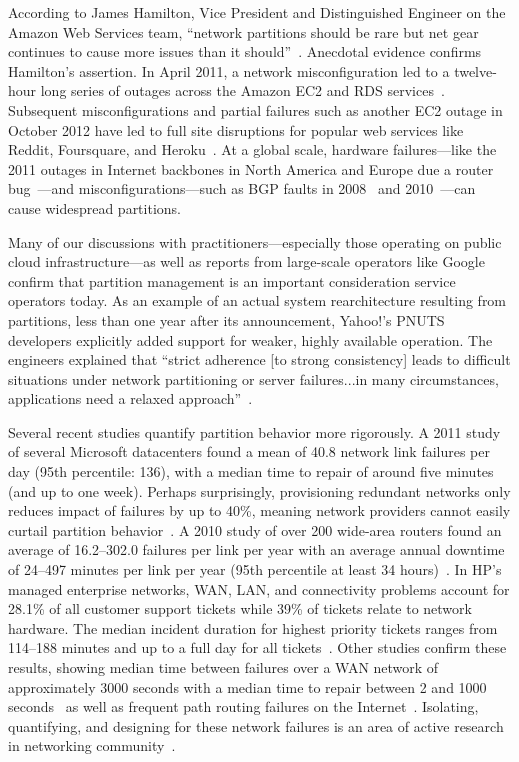 According to James Hamilton, Vice President and Distinguished Engineer
on the Amazon Web Services team, ``network partitions should be rare
but net gear continues to cause more issues than it
should''~\cite{hamilton-partitions}. Anecdotal evidence confirms
Hamilton's assertion. In April 2011, a network misconfiguration led to
a twelve-hour long series of outages across the Amazon EC2 and RDS
services~\cite{amazon-netpartition}. Subsequent misconfigurations and
partial failures such as another EC2 outage in October 2012 have led
to full site disruptions for popular web services like Reddit,
Foursquare, and Heroku~\cite{ec2-downsites}. At a global scale,
hardware failures---like the 2011 outages in Internet backbones in
North America and Europe due a router
bug~\cite{juniper-partition}---and misconfigurations---such as BGP
faults in 2008~\cite{pakistan-youtube} and
2010~\cite{research-experiment-partition}---can cause widespread
partitions.

Many of our discussions with practitioners---especially those
operating on public cloud infrastructure---as well as reports from
large-scale operators like Google~\cite{dean-keynote} confirm that
partition management is an important consideration service operators
today. As an example of an actual system rearchitecture resulting from
partitions, less than one year after its announcement, Yahoo!'s PNUTS
developers explicitly added support for weaker, highly available
operation. The engineers explained that ``strict adherence [to strong
  consistency] leads to difficult situations under network
partitioning or server failures...in many circumstances, applications
need a relaxed approach''~\cite{pnuts-update}.

Several recent studies quantify partition behavior more rigorously. A
2011 study of several Microsoft datacenters found a mean of 40.8
network link failures per day (95th percentile: 136), with a median
time to repair of around five minutes (and up to one week). Perhaps
surprisingly, provisioning redundant networks only reduces impact of
failures by up to 40\%, meaning network providers cannot easily
curtail partition behavior~\cite{sigcomm-dc}. A 2010 study of over 200
wide-area routers found an average of 16.2--302.0 failures per link
per year with an average annual downtime of 24--497 minutes per link
per year (95th percentile at least 34 hours)~\cite{sigcomm-wan}. In
HP's managed enterprise networks, WAN, LAN, and connectivity problems
account for 28.1\% of all customer support tickets while 39\% of
tickets relate to network hardware.  The median incident duration for
highest priority tickets ranges from 114--188 minutes and up to a full
day for all tickets~\cite{turner2012failure}. Other studies confirm
these results, showing median time between failures over a WAN network
of approximately 3000 seconds with a median time to repair between 2
and 1000 seconds~\cite{ip-backbone-failures} as well as frequent path
routing failures on the Internet~\cite{labovitz-failures}. Isolating,
quantifying, and designing for these network failures is an area of
active research in networking
community~\cite{surviving-failures-bodik, uw-failure-networks}.

